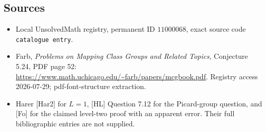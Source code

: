 \documentclass[11pt]{article}
\begin{document}
\subsection{Sources}
\begin{itemize}
\item Local UnsolvedMath registry, permanent ID \(11000068\), exact source code \texttt{catalogue entry}.
\item Farb, \emph{Problems on Mapping Class Groups and Related Topics}, Conjecture 5.24, PDF page 52: \url{https://www.math.uchicago.edu/~farb/papers/mcgbook.pdf}. Registry access 2026-07-29; pdf-font-structure extraction.
\item Harer [Har2] for \(L=1\), [HL] Question 7.12 for the Picard-group question, and [Fo] for the claimed level-two proof with an apparent error. Their full bibliographic entries are not supplied.
\end{itemize}
\end{document}
